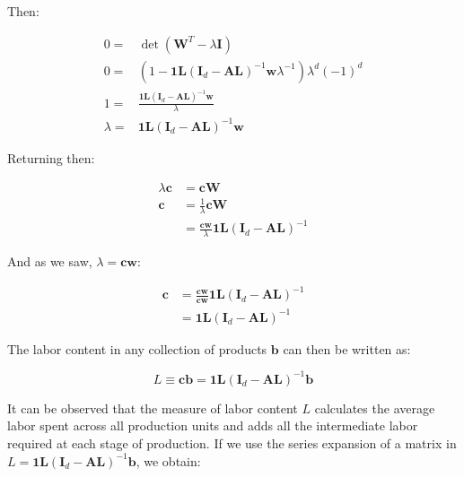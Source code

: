 Then:

\begin{align}
0= & \det\left(\boldsymbol{W}^{T}-\lambda\boldsymbol{I}\right)\\
0= & \left(1-\boldsymbol{1}\boldsymbol{L}\left(\boldsymbol{I}_{d}-\boldsymbol{A}\boldsymbol{L}\right)^{-1}\boldsymbol{w}\lambda^{-1}\right)\lambda^{d}\left(-1\right)^{d}\\
1= & \frac{\boldsymbol{1}\boldsymbol{L}\left(\boldsymbol{I}_{d}-\boldsymbol{A}\boldsymbol{L}\right)^{-1}\boldsymbol{w}}{\lambda}\\
\lambda= & \boldsymbol{1}\boldsymbol{L}\left(\boldsymbol{I}_{d}-\boldsymbol{A}\boldsymbol{L}\right)^{-1}\boldsymbol{w}
\end{align}

Returning then:


\begin{align}
\lambda\boldsymbol{c} & =\boldsymbol{cW}\\
\boldsymbol{c} & =\frac{1}{\lambda}\boldsymbol{cW}\\
 & =\frac{\boldsymbol{c}\boldsymbol{w}}{\lambda}\boldsymbol{1}\boldsymbol{L}\left(\boldsymbol{I}_{d}-\boldsymbol{A}\boldsymbol{L}\right)^{-1}
\end{align}

And as we saw, $\lambda = \boldsymbol{c} \boldsymbol{w}$:

\begin{align}
\boldsymbol{c} & =\frac{\boldsymbol{c}\boldsymbol{w}}{\boldsymbol{c}\boldsymbol{w}}\boldsymbol{1}\boldsymbol{L}\left(\boldsymbol{I}_{d}-\boldsymbol{A}\boldsymbol{L}\right)^{-1}\\
 & =\boldsymbol{1}\boldsymbol{L}\left(\boldsymbol{I}_{d}-\boldsymbol{A}\boldsymbol{L}\right)^{-1}
\end{align}


The labor content in any collection of products $\boldsymbol{b}$ can then be written as:

\begin{equation}
L\equiv\boldsymbol{c}\boldsymbol{b}=\boldsymbol{1}\boldsymbol{L}\left(\boldsymbol{I}_{d}-\boldsymbol{A}\boldsymbol{L}\right)^{-1}\boldsymbol{b}
\end{equation}

It can be observed that the measure of labor content $L$ calculates the average labor spent across all production units and adds all the intermediate labor required at each stage of production. If we use the series expansion of a matrix in $L = \boldsymbol{1}\boldsymbol{L}\left(\boldsymbol{I}_{d}-\boldsymbol{A}\boldsymbol{L}\right)^{-1}\boldsymbol{b}$, we obtain:


